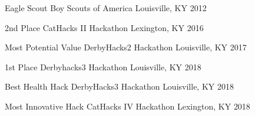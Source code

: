 



\begin{cvhonors}

  \cvhonor
    {Eagle Scout} %
    {Boy Scouts of America} %
    {Louisville, KY} %
    {2012} %

  \cvhonor
    {2nd Place} %
    {CatHacks II Hackathon} %
    {Lexington, KY} %
    {2016} %

  \cvhonor
    {Most Potential Value} %
    {DerbyHacks2 Hackathon} %
    {Louisville, KY} %
    {2017} %

  \cvhonor
    {1st Place} %
    {Derbyhacks3 Hackathon} %
    {Louisville, KY} %
    {2018} %

  \cvhonor
    {Best Health Hack} %
    {DerbyHacks3 Hackathon} %
    {Louisville, KY} %
    {2018} %

  \cvhonor
    {Most Innovative Hack} %
    {CatHacks IV Hackathon} %
    {Lexington, KY} %
    {2018} %

\end{cvhonors}
